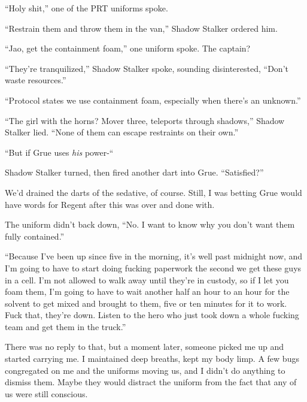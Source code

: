 ``Holy shit,'' one of the PRT uniforms spoke.



``Restrain them and throw them in the van,'' Shadow Stalker ordered him.



``Jao, get the containment foam,'' one uniform spoke.  The captain?



``They're tranquilized,'' Shadow Stalker spoke, sounding disinterested, ``Don't waste resources.''



``Protocol states we use containment foam, especially when there's an unknown.''



``The girl with the horns?  Mover three, teleports through shadows,'' Shadow Stalker lied.  ``None of them can escape restraints on their own.''



``But if Grue uses \emph{his} power-``



Shadow Stalker turned, then fired another dart into Grue.  ``Satisfied?''



We'd drained the darts of the sedative, of course.  Still, I was betting Grue would have words for Regent after this was over and done with.



The uniform didn't back down, ``No.  I want to know why you don't want them fully contained.''



``Because I've been up since five in the morning, it's well past midnight now, and I'm going to have to start doing fucking paperwork the second we get these guys in a cell.  I'm not allowed to walk away until they're in custody, so if I let you foam them, I'm going to have to wait another half an hour to an hour for the solvent to get mixed and brought to them, five or ten minutes for it to work.  Fuck that, they're down.  Listen to the hero who just took down a whole fucking team and get them in the truck.''



There was no reply to that, but a moment later, someone picked me up and started carrying me.  I maintained deep breaths, kept my body limp.  A few bugs congregated on me and the uniforms moving us, and I didn't do anything to dismiss them.  Maybe they would distract the uniform from the fact that any of us were still conscious.



